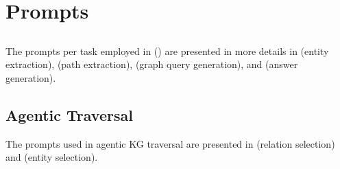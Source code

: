 \section{Prompts}
\subsection{\glink}
\label{app:linker-prompt}




The prompts per task employed in \glink () are presented in more details in  (entity extraction),  (path extraction),  (graph query generation), and  (answer generation).



\subsection{Agentic Traversal}
\label{app:agent-prompt}
The prompts used in agentic KG traversal are presented in  (relation selection) and  (entity selection).

